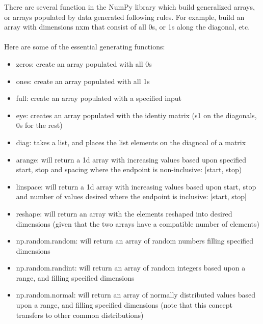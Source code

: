 
There are several function in the NumPy library which build generalized arrays, or arrays populated by data generated following rules. For example, build an array with dimensions nxm that consist of all 0s, or 1s along the diagonal, etc.
\\\\

Here are some of the essential generating functions:
\begin{itemize}
	\item zeros: create an array populated with all 0s
	\item ones: create an array populated with all 1s
	\item full: create an array populated with a specified input
	\item eye: creates an array populated with the identiy matrix (s1 on the diagonals, 0s for the rest)
	\item diag: takes a list, and places the list elements on the diagnoal of a matrix
	\item arange: will return a 1d array with increasing values based upon specified start, stop and spacing where the endpoint is non-inclusive: [start, stop)
	\item linspace: will return a 1d array with increasing values based upon start, stop and number of values desired where the endpoint is inclusive: [start, stop]
	\item reshape: will return an array with the elements reshaped into desired dimensions (given that the two arrays have a compatible number of elements)
	\item np.random.random: will return an array of random numbers filling specified dimensions
	\item np.random.randint: will return an array of random integers based upon a range, and filling specified dimensions
	\item np.random.normal: will return an array of normally distributed values based upon a range, and filling specified dimensions (note that this concept transfers to other common distributions)
\end{itemize}

